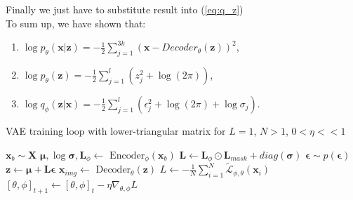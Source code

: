 \documentclass[10pt]{article}
\begin{document}
Finally we just have to substitute result into (\ref{eq:q_z}) \\
To sum up, we have shown that: 
\begin{enumerate}
    \item $\log p_{\theta }(\textbf{x}|\textbf{z}) = 
    -\frac{1}{2}\sum_{j=1}^{3k}( \textbf{x} - Decoder_{\theta}(\textbf{z} ) )^2$,
    \item $  \log p_{\theta }(\textbf{z}) = -\frac{1}{2}\sum_{j=1}^{l}( z_j^{2} + \log(2\pi) )$,
    \item $\log q_{\phi }(\textbf{z}|\textbf{x}) = 
    -\frac{1}{2}\sum_{j=1}^{l}( \epsilon_j^{2} + \log(2\pi) + \log \sigma_j )$.
\end{enumerate}

\begin{algorithm} [H]
\caption{VAE training loop with lower-triangular matrix for $L=1$, $N > 1$, 
$ 0 < \eta << 1$}\label{alg:cap}
\begin{algorithmic}
\State $\textbf{x}_{b} \sim \textbf{X}$
\State $\bm{\mu}, \log \bm{\sigma}, \textbf{L}_{\phi} \gets \text{ Encoder}_{\phi}(\textbf{x}_{b}) $
\State $\textbf{L} \gets \textbf{L}_{\phi} \odot \textbf{L}_{mask} + diag(\bm \sigma)$
\State $\bm{\epsilon} \sim p(\bm{\epsilon})$
\State $\textbf{z} \gets \bm{\mu} + \textbf{L}\bm{\epsilon}$
\State $\textbf{x}_{img} \gets \text{ Decoder}_{\theta}(\textbf{z}) $
\State $ L
    \gets  -\frac{1}{N}\sum_{i=1}^{N} \tilde{ \mathcal{L}}_{\phi, \theta}(\textbf{x}_{i})  $
\State $ [\theta, \phi]_{t+1} \gets [\theta, \phi]_{t} - \eta \nabla_{\theta, \phi}L$
\EndWhile
\end{algorithmic}
\end{algorithm}
\end{document}
